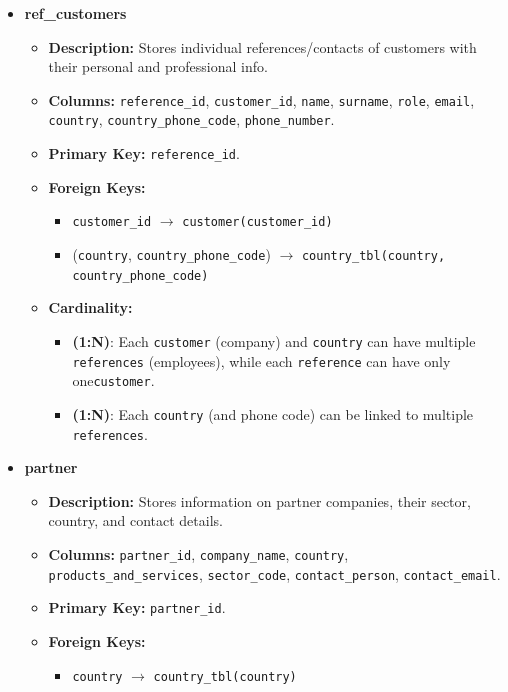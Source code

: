\documentclass[12pt,a4paper]{article}
\begin{document}
\begin{itemize}
    \item \textbf{ref\_customers}
    \begin{itemize}
        \item \textbf{Description:} Stores individual references/contacts of customers with their personal and professional info.
        \item \textbf{Columns:} \texttt{reference\_id}, \texttt{customer\_id}, \texttt{name}, \texttt{surname}, \texttt{role}, \texttt{email}, \texttt{country}, \texttt{country\_phone\_code}, \texttt{phone\_number}.
        \item \textbf{Primary Key:} \texttt{reference\_id}.
        \item \textbf{Foreign Keys:}
        \begin{itemize}
            \item \texttt{customer\_id} $\to$ \texttt{customer(customer\_id)}
             \item (\texttt{country}, \texttt{country\_phone\_code}) $\to$ \texttt{country\_tbl(country, country\_phone\_code)}
        \end{itemize}
        \item \textbf{Cardinality:}
        \begin{itemize}
            \item \textbf{(1:N)}: Each \texttt{customer} (company) and \texttt{country} can have multiple \texttt{references} (employees), while each \texttt{reference} can have only one\texttt{customer}.
             \item \textbf{(1:N)}: Each \texttt{country} (and phone code) can be linked to multiple \texttt{references}.
        \end{itemize}
      \end{itemize}  
  \item \textbf{partner}
    \begin{itemize}
        \item \textbf{Description:} Stores information on partner companies, their sector, country, and contact details.
        \item \textbf{Columns:} \texttt{partner\_id}, \texttt{company\_name}, \texttt{country}, \texttt{products\_and\_services}, \texttt{sector\_code}, \texttt{contact\_person}, \texttt{contact\_email}.
        \item \textbf{Primary Key:} \texttt{partner\_id}.
        \item \textbf{Foreign Keys:}
        \begin{itemize}
            \item \texttt{country} $\to$ \texttt{country\_tbl(country)} \\

\end{itemize}
\end{itemize}
\end{itemize}
\end{document}

